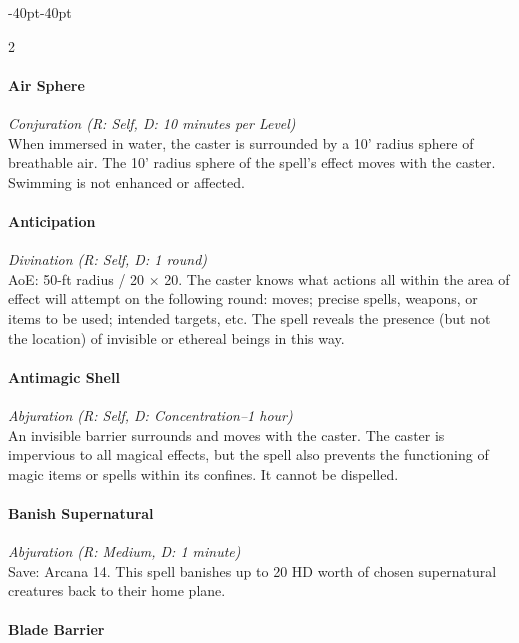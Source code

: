 \documentclass{book}
\begin{document}
\begin{adjustwidth}{-40pt}{-40pt}
\begin{multicols}{2}
\paragraph{Air Sphere}\label{air-sphere}

\emph{Conjuration (R: Self, D: 10 minutes per Level)}\\
When immersed in water, the caster is surrounded by a 10' radius sphere
of breathable air. The 10' radius sphere of the spell's effect moves
with the caster. Swimming is not enhanced or affected.

\paragraph{Anticipation}\label{anticipation}

\emph{Divination (R: Self, D: 1 round)}\\
AoE: 50-ft radius / 20 × 20. The caster knows what actions all within
the area of effect will attempt on the following round: moves; precise
spells, weapons, or items to be used; intended targets, etc. The spell
reveals the presence (but not the location) of invisible or ethereal
beings in this way.

\paragraph{Antimagic Shell}\label{antimagic-shell}

\emph{Abjuration (R: Self, D: Concentration--1 hour)}\\
An invisible barrier surrounds and moves with the caster. The caster is
impervious to all magical effects, but the spell also prevents the
functioning of magic items or spells within its confines. It cannot be
dispelled.

\paragraph{Banish Supernatural}\label{banish-supernatural}

\emph{Abjuration (R: Medium, D: 1 minute)}\\
Save: Arcana 14. This spell banishes up to 20 HD worth of chosen
supernatural creatures back to their home plane.

\paragraph{Blade Barrier}\label{blade-barrier}


\end{multicols}
\end{adjustwidth}
\end{document}
